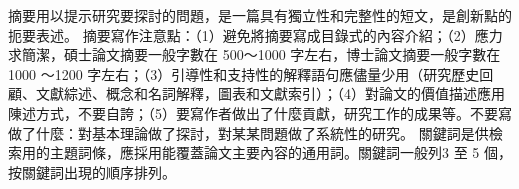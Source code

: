 摘要用以提示研究要探討的問題，是一篇具有獨立性和完整性的短文，是創新點的扼要表述。
摘要寫作注意點：（1）避免將摘要寫成目錄式的內容介紹；（2）應力求簡潔，碩士論文摘要一般字數在 500～1000 字左右，博士論文摘要一般字數在 1000 ～1200 字左右；（3）引導性和支持性的解釋語句應儘量少用（研究歷史回顧、文獻綜述、概念和名詞解釋，圖表和文獻索引）；（4）對論文的價值描述應用陳述方式，不要自誇；（5）要寫作者做出了什麼貢獻，研究工作的成果等。不要寫做了什麼：對基本理論做了探討，對某某問題做了系統性的研究。
關鍵詞是供檢索用的主題詞條，應採用能覆蓋論文主要內容的通用詞。關鍵詞一般列3 至 5 個，按關鍵詞出現的順序排列。